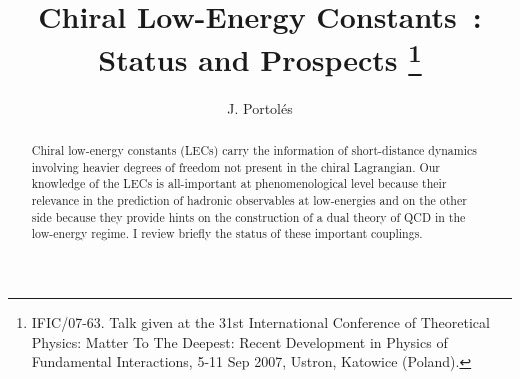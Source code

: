 \documentclass{appolb}
\begin{document}
\title{Chiral Low-Energy Constants~: Status and Prospects
\thanks{IFIC/07-63. Talk given at the 31st International Conference of Theoretical Physics: 
Matter To The Deepest: Recent Development in Physics of Fundamental Interactions,
5-11 Sep 2007, Ustron, Katowice (Poland).}%
}
\author{J. Portol\'es
\address{Instituto de F\'{\i}sica Corpuscular, IFIC, CSIC-Universitat de Val\`encia, \\ Apt. Correus 22085,
E-46071 Val\`encia, Spain}
}
\maketitle
\begin{abstract}
Chiral low-energy constants (LECs) carry the information of short-distance dynamics involving heavier degrees of freedom not present in the chiral Lagrangian. Our knowledge of the LECs is all-important at phenomenological level because their relevance in the prediction of hadronic observables at low-energies and on the other side because they provide hints on the construction of a dual theory of QCD in the low-energy
regime. I review briefly the status of these important couplings.
\end{abstract}
  
\end{document}
